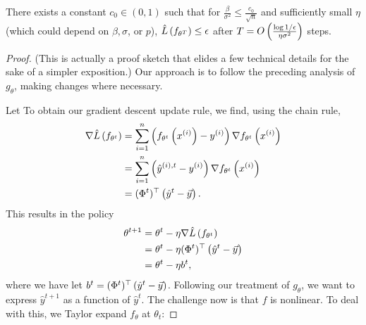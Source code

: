 \begin{theorem}
There exists a constant $c_0 \in (0, 1)$ such that for $\frac{\beta}{\sigma^2} \leq \frac{c_0}{\sqrt{n}}$ and sufficiently small $\eta$ (which could depend on $\beta, \sigma$, or $p$), $\hat{L}\left(f_{\theta^T}\right) \leq \epsilon$ after $T = O \left(\frac{\log 1/\epsilon}{\eta\sigma^2}\right)$ steps. \label{lec14:theorem:optimization_f} 
\end{theorem}

\begin{proof}

(This is actually a proof sketch that elides a few technical details for the sake of a simpler exposition.) Our approach is to follow the preceding analysis of $g_\theta$, making changes where necessary.

Let  
To obtain our gradient descent update rule, we find, using the chain rule,
\begin{align}
    \nabla \hat{L}\left(f_{\theta^t}\right) &=  \sum_{i=1}^n\left(f_{\theta^t}\left(x^{(i)}\right) - y^{(i)}\right)\nabla f_{\theta^t}\left(x^{(i)}\right) \\ 
    &=  \sum_{i=1}^n\left(\hat{y}^{(i), t} - y^{(i)}\right)\nabla f_{\theta^t}\left(x^{(i)}\right) \\
    &= (\Phi^t)^\top\left(\hat{y}^t - \vec{y}\right).
\end{align}
This results in the policy
\begin{align}
    \theta^{t+1} &= \theta^t - \eta \nabla \hat{L}\left(f_{\theta^t}\right) \\
    &= \theta^t - \eta (\Phi^t)^\top\left(\hat{y}^t - \vec{y}\right) \\ 
    &= \theta^t - \eta b^t,
\end{align}
where we have let $b^t = (\Phi^t)^\top\left(\hat{y}^t - \vec{y}\right)$. Following our treatment of $g_\theta$, we want to express $\hat{y}^{t+1}$ as a function of $\hat{y}^{t}$. The challenge now is that $f$ is nonlinear. To deal with this, we Taylor expand $f_\theta$ at $\theta_t$:


\end{proof}
